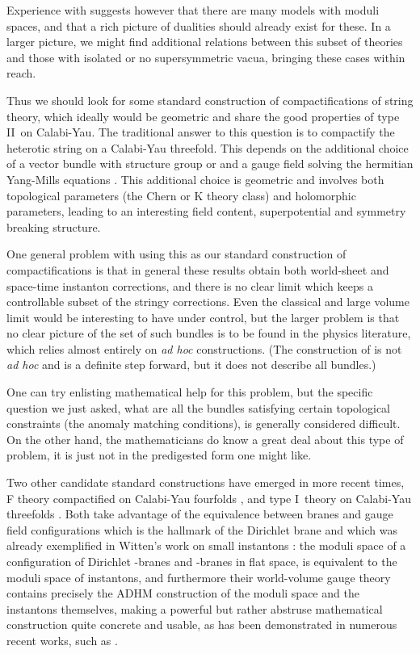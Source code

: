 \documentclass[a4paper,12pt]{amsart}
\numberwithin{equation}{section}
\theoremstyle{plain}
\theoremstyle{definition}
\def\Bbb#1{{\fam\black\relax#1}}
\def\Bbb{\bf}
\def\cal{\mathcal}
\def \I {I}
\def \II {II}
\def\BZ{\Bbb{Z}}
\def\CN{{\cal N}}
\begin{document}
Experience with \myHighlight{$\CN=1$}\coordHE{} suggests however that there are many models
with moduli spaces, and that a rich picture of dualities should
already exist for these.  In a larger picture, we might find
additional relations between this subset of theories and those with
isolated or no supersymmetric vacua, bringing these cases within reach.

Thus we should look for some standard construction of \myHighlight{$\CN=1$}\coordHE{}
compactifications of string theory, which ideally would be geometric
and share the good properties of type \II\ on Calabi-Yau.  The
traditional answer to this question is to compactify the heterotic
string on a Calabi-Yau threefold.  This depends on the additional
choice of a vector bundle with structure group \coordHE{}
or \myHighlight{$G\subset Spin(32)/\BZ_2$}\coordHE{} and a gauge field solving the hermitian
Yang-Mills equations \cite{GSW}.  This additional choice is geometric and
involves both topological parameters (the Chern or K theory class) and
holomorphic parameters, leading to an interesting field content,
superpotential and symmetry breaking structure.

One general problem with using this as our standard construction of
\myHighlight{$\CN=1$}\coordHE{} compactifications is that in general these results obtain both
world-sheet and space-time instanton corrections, and there is no
clear limit which keeps a controllable subset of the stringy
corrections.  Even the classical and large volume limit would be
interesting to have under control, but the larger problem is that no
clear picture of the set of such bundles is to be found in the physics
literature, which relies almost entirely on {\it ad hoc} constructions.
(The construction of \cite{FMW} is not {\it ad hoc} and is a definite
step forward, but it does not describe all bundles.)

One can try enlisting mathematical help for this problem, but the
specific question we just asked, what are all the bundles satisfying
certain topological constraints (the anomaly matching conditions), is
generally considered difficult.  On the other hand, the mathematicians
do know a great deal about this type of problem, it is just not in the
predigested form one might like.

Two other candidate standard constructions have emerged in more recent
times, F theory compactified on Calabi-Yau fourfolds \cite{Vafa}, and
type \I\ theory on Calabi-Yau threefolds \cite{Sagnotti}.  Both
take advantage of the equivalence between branes and gauge
field configurations which is the hallmark of the Dirichlet brane and
which was already exemplified in Witten's work on small instantons
\cite{Witten}: the moduli space of a configuration of Dirichlet
\coordHE{}-branes and \coordHE{}-branes in flat space, is equivalent to the moduli
space of instantons, and furthermore their world-volume gauge theory
contains precisely the ADHM construction of the moduli space and the
instantons themselves, making a powerful but rather abstruse
mathematical construction quite concrete and usable, as has been
demonstrated in numerous recent works, such as \cite{Dorey}.
\end{document}
